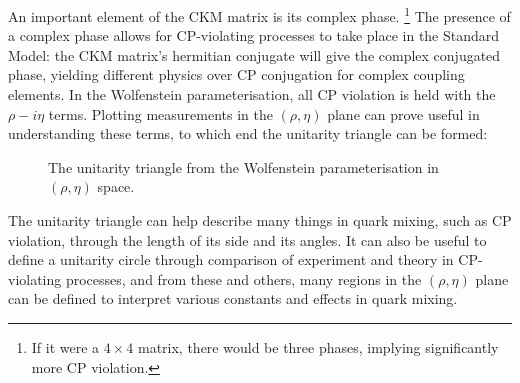 \documentclass[a4paper,12pt]{article}
\begin{document}
An important element of the CKM matrix is its complex phase.
\hspace{-10pt}\footnote{If it were a $4\times4$ matrix, there would be three phases, implying significantly more CP violation.}
\hspace{-5pt}The presence of a complex phase allows for CP-violating processes to take place in the Standard Model: the CKM matrix's hermitian conjugate will give the complex conjugated phase, yielding different physics over CP conjugation for complex coupling elements. 
In the Wolfenstein parameterisation, all CP violation is held with the $\rho-i\eta$ terms. 
Plotting measurements in the $(\rho,\eta)$ plane can prove useful in understanding these terms, to which end the unitarity triangle can be formed:
\begin{figure}[H]
    \centering
    \caption{\label{fig:unitang} The unitarity triangle from the Wolfenstein parameterisation in $(\rho,\eta)$ space.}
\end{figure}
The unitarity triangle can help describe many things in quark mixing, such as CP violation, through the length of its side and its angles. 
It can also be useful to define a unitarity circle through comparison of experiment and theory in CP-violating processes, and from these and others, many regions in the $(\rho,\eta)$ plane can be defined to interpret various constants and effects in quark mixing. 
\end{document}
